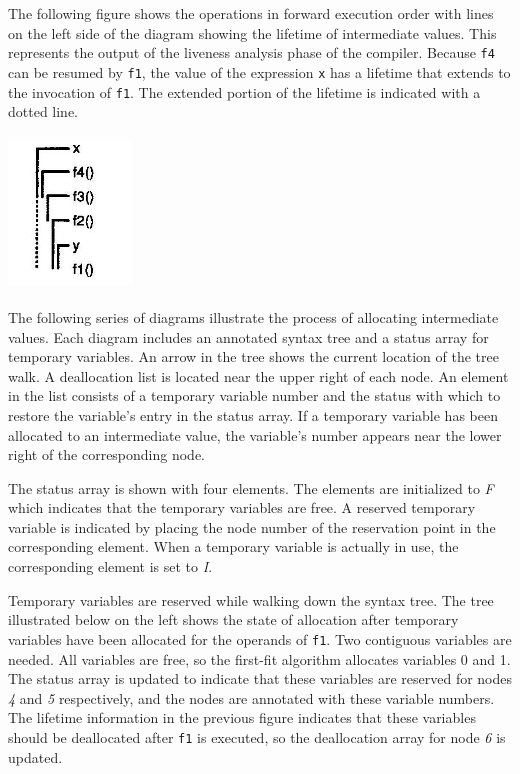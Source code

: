 The following figure shows the operations in forward execution order
with lines on the left side of the diagram showing the lifetime of
intermediate values. This represents the output of the liveness
analysis phase of the compiler. Because \texttt{f4} can be resumed by
\texttt{f1}, the value of the expression \texttt{x} has a lifetime
that extends to the invocation of \texttt{f1}. The extended portion of
the lifetime is indicated with a dotted line.

{\centering{}
\includegraphics[width=1.3in,height=1.6in]{kw/figure8-2.png}
\par}


The following series of diagrams illustrate the process of allocating
intermediate values. Each diagram includes an annotated syntax tree
and a status array for temporary variables. An arrow in the tree shows
the current location of the tree walk. A deallocation list is located
near the upper right of each node. An element in the list consists of
a temporary variable number and the status with which to restore the
variable's entry in the status array. If a temporary variable has been
allocated to an intermediate value, the variable's number appears near
the lower right of the corresponding node.

The status array is shown with four elements. The elements are
initialized to \textit{F} which indicates that the temporary variables
are free. A reserved temporary variable is indicated by placing the
node number of the reservation point in the corresponding
element. When a temporary variable is actually in use, the
corresponding element is set to \textit{I}.

Temporary variables are reserved while walking down the syntax
tree. The tree illustrated below on the left shows the state of
allocation after temporary variables have been allocated for the
operands of \texttt{f1}. Two contiguous variables are needed. All
variables are free, so the first-fit algorithm allocates variables 0
and 1. The status array is updated to indicate that these variables
are reserved for nodes \textit{4} and \textit{5} respectively, and the
nodes are annotated with these variable numbers. The lifetime
information in the previous figure indicates that these variables
should be deallocated after \texttt{f1} is executed, so the
deallocation array for node \textit{6} is updated.

